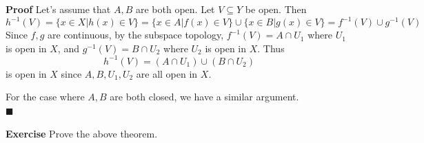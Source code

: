 \documentclass[main.tex]{subfiles}
\begin{document}
\par \noindent \textbf{Proof} Let's assume that $A, B$ are both open. Let $V \subseteq Y$ be open. Then 
\begin{equation}
    h^{-1} (V) = \{ x \in X | h(x) \in V \} = \{ x \in A | f(x) \in V \} \cup \{ x \in B | g(x) \in V \} = f^{-1} (V) \cup g^{-1} (V)
\end{equation}
Since $f, g$ are continuous, by the subspace topology, $f^{-1} (V) = A \cap U_1$ where $U_1$ is open in $X$, and $g^{-1} (V) = B \cap U_2$ where $U_2$ is open in $X$. Thus 
\begin{equation}
    h^{-1} (V) = (A \cap U_1) \cup (B \cap U_2)
\end{equation}
is open in $X$ since $A, B, U_1, U_2$ are all open in $X$. 
\par For the case where $A, B$ are both closed, we have a similar argument. 
\mbox{} \\ \null \hfill $\blacksquare$ 
\par \noindent \textbf{Exercise} Prove the above theorem.
\end{document}
